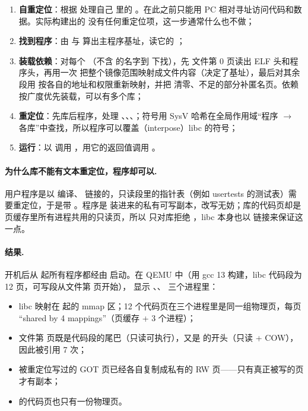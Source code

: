 \begin{enumerate}
  \item \textbf{自重定位}：根据  处理自己  里的 。在此之前只能用 PC 相对寻址访问代码和数据。实际构建出的  没有任何重定位项，这一步通常什么也不做；
  \item \textbf{找到程序}：由  与  算出主程序基址，读它的 ；
  \item \textbf{装载依赖}：对每个 （不含 \code{/} 的名字到  下找），先  文件第 0 页读出 ELF 头和程序头，再用一次  把整个镜像范围映射成文件内容（决定了基址），最后对其余段用  按各自的地址和权限重新映射，并把  清零、不足的部分补匿名页。依赖按广度优先装载，可以有多个库；
  \item \textbf{重定位}：先库后程序，处理 、、、；符号用 SysV 哈希在全局作用域“程序 $\to$ 各库”中查找，所以程序可以覆盖（interpose）libc 的符号；
  \item \textbf{运行}：以  调用 ，用它的返回值调用 。
\end{enumerate}

\paragraph{为什么库不能有文本重定位，程序却可以.} 用户程序是以  编译、 链接的，只读段里的指针表（例如 usertests 的测试表）需要重定位，于是带 。程序是  装进来的私有可写副本，改写无妨；库的代码页却是页缓存里所有进程共用的只读页，所以  只对库拒绝 ，libc 本身也以  链接来保证这一点。

\paragraph{结果.} 开机后从  起所有程序都经由  启动。在 QEMU 中（用 gcc 13 构建，libc 代码段为 12 页，可写段从文件第  页开始）， 显示 、、 三个进程里：

\begin{itemize}
  \item libc 映射在  起的 mmap 区；12 个代码页在三个进程里是同一组物理页，每页 “shared by 4 mappings”（页缓存 + 3 个进程）；
  \item 文件第  页既是代码段的尾巴（只读可执行），又是  的开头（只读 + COW），因此被引用 7 次；
  \item 被重定位写过的 GOT 页已经各自复制成私有的 RW 页——只有真正被写的页才有副本；
  \item {} 的代码页也只有一份物理页。
\end{itemize}


